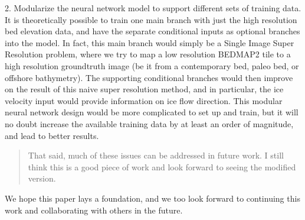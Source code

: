 2. Modularize the neural network model to support different sets of training data.
It is theoretically possible to train one main branch with just the high resolution bed elevation data, and have the separate conditional inputs as optional branches into the model.
In fact, this main branch would simply be a Single Image Super Resolution problem, where we try to map a low resolution BEDMAP2 tile to a high resolution groundtruth image (be it from a contemporary bed, paleo bed, or offshore bathymetry).
The supporting conditional branches would then improve on the result of this naive super resolution method, and in particular, the ice velocity input would provide information on ice flow direction.
This modular neural network design would be more complicated to set up and train, but it will no doubt increase the available training data by at least an order of magnitude, and lead to better results.

\begin{quote}
\color{blue}
  That said, much of these issues can be addressed in future work.
  I still think this is a good piece of work and look forward to seeing the modified version.
\end{quote}

We hope this paper lays a foundation, and we too look forward to continuing this work and collaborating with others in the future.

